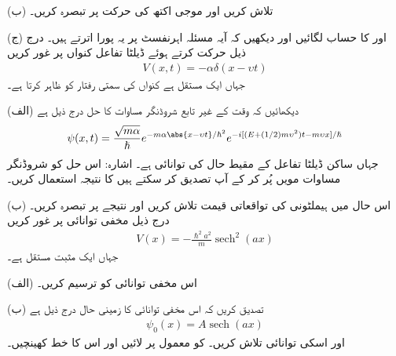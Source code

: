(ب)  تلاش کریں اور موجی اکتھ کی حرکت پر تبصرہ کریں۔

(ج)  اور  کا حساب لگائیں اور دیکھیں کہ آیہ مسئلہ اہرنفسٹ  پر یہ پورا اترتے ہیں۔
درج ذیل حرکت کرتے ہوئے ڈیلٹا تفاعل کنواں پر غور کریں 
\begin{align*}
	V(x, t)=-\alpha\delta(x-\upsilon t)
\end{align*}
جہاں  ایک مستقل ہے کنواں کی سمتی رفتار کو ظاہر کرتا ہے۔

(الف) دیکھائیں کہ وقت کے غیر تابع شروڈنگر مساوات کا حل درج ذیل ہے
\begin{align*}
	\psi(x, t)=\frac{\sqrt{m\alpha}}{\hslash}e^{-m\alpha\abs{x-\upsilon t}/\hbar^2}e^{-i[(E+(1/2)m\upsilon^2)t-m\upsilon x]/\hslash}
\end{align*}
جہاں  ساکن ڈیلٹا تفاعل کے مقیط حال کی توانائی ہے۔ اشارہ: اس حل کو شروڈنگر مساوات مویں پُر کر کے آپ تصدیق کر سکتے ہیں  کا نتیجہ استعمال کریں۔

(ب) اس حال میں ہیملٹونی کی تواقعاتی قیمت تلاش کریں اور نتیجے پر تبصرہ کریں۔
درج ذیل مخفی توانائی پر غور کریں 
\begin{align*}
	V(x)=-\frac{\hslash^2a^2}{m}\operatorname{sech}^2(ax)
\end{align*}
جہاں  ایک مثبت مستقل ہے۔

(الف) اس مخفی توانائی کو ترسیم کریں۔

(ب) تصدیق کریں کہ اس مخفی توانائی کا زمینی حال درج ذیل ہے
\begin{align*}
	\psi_0(x)=A\operatorname{sech}(ax)
\end{align*}
اور اسکی توانائی تلاش کریں۔  کو معمول پر لائیں اور اس کا خط کھینچیں۔

